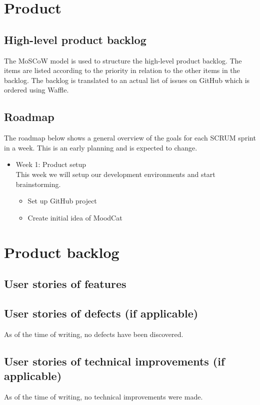 \chapter{Product}

\section{High-level product backlog}
The MoSCoW model is used to structure the high-level product backlog.
The items are listed according to the priority in relation to the other items in the backlog.
The backlog is translated to an actual list of issues on GitHub which is ordered using Waffle\cite{waffle}.


\section{Roadmap}
The roadmap below shows a general overview of the goals for each SCRUM sprint in a week.
This is an early planning and is expected to change.

\begin{itemize}
\item Week 1: Product setup\\
This week we will setup our development environments and start brainstorming.

\begin{itemize}
\item Set up GitHub project \cite{githubRepo}
\item Create initial idea of MoodCat
\end{itemize}
\end{itemize}

\chapter{Product backlog}

\section{User stories of features}

\section{User stories of defects (if applicable)}
As of the time of writing, no defects have been discovered.

\section{User stories of technical improvements (if applicable)}
As of the time of writing, no technical improvements were made.

